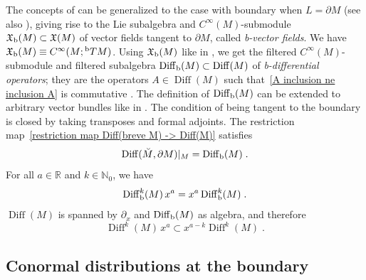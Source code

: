\documentclass{memo-l}
\theoremstyle{plain}
\theoremstyle{definition}
\theoremstyle{remark}
\newcommand{\N}{\mathbb{N}}
\newcommand{\R}{\mathbb{R}}
\newcommand{\fX}{\mathfrak{X}}
\newcommand{\Diff}{\operatorname{Diff}}
\newcommand{\bT}{{}^{\text{\rm b}}T}
\newcommand{\Diffb}{\Diff_{\text{\rm b}}}
\newcommand{\fXb}{\fX_{\text{\rm b}}}
\numberwithin{section}{chapter}
\numberwithin{equation}{section}%
\begin{document}
The concepts of  can be generalized to the case with boundary when $L=\partial M$ \cite[Chapter~6]{Melrose1996} (see also \cite[Section~4.9]{Melrose1993}), giving rise to the Lie subalgebra and $C^\infty(M)$-submodule $\fXb(M)\subset\fX(M)$ \index{$\fXb(M)$} of vector fields tangent to $\partial M$, called \emph{b-vector fields}.  We have $\fXb(M)\equiv C^\infty(M;\bT M)$. \index{$\fXb(M)$} Using $\fXb(M)$  like in , we get the filtered $C^\infty(M)$-submodule and filtered subalgebra $\Diffb(M)\subset\Diff(M)$ \index{$\Diffb(M)$} of \emph{b-differential operators};  they are the operators $A\in\Diff(M)$ such that~\eqref{A inclusion ne inclusion A} is commutative \cite[Exercise~3.4.20]{Melrose1996}. The definition of $\Diffb(M)$ can be extended to arbitrary vector bundles like in . The condition of being tangent to the boundary is closed by taking transposes and formal adjoints. The restriction map~\eqref{restriction map Diff(breve M) -> Diff(M)} satisfies
\begin{equation}\label{Diff(breve M,partial M) = Diffb(M)}
\Diff(\breve M,\partial M)|_M=\Diffb(M)\;.
\end{equation}
For all $a\in\R$ and $k\in\N_0$, we have \cite[Eqs.~(4.2.7) and~(4.2.8)]{Melrose1996}
\begin{equation}\label{Diffb^k(M) x^a = x^a Diffb^k(M)}
\Diffb^k(M)\,x^a=x^a\Diffb^k(M)\;.
\end{equation}
$\Diff(M)$ is spanned by $\partial_x$ and $\Diffb(M)$ as algebra, and therefore
\begin{equation}\label{Diff^k(M) x^a subset x^a-k Diff^k(M)}
\Diff^k(M)\,x^a\subset x^{a-k}\Diff^k(M)\;.
\end{equation}



\subsection{Conormal distributions at the boundary}
\label{ss: conormality at the boundary - Sobolev order}
\end{document}
